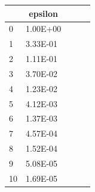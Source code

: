 \begin{table}[H]
\begin{tabular}{lllll}
\rowcolor[HTML]{9AB4FF} 
\multicolumn{1}{c}{\cellcolor[HTML]{9AB4FF} row} & \multicolumn{1}{c}{\cellcolor[HTML]{9AB4FF} epsilon}\\ \hline
0 & 1.00E+00 \\ \hline1 & 3.33E-01 \\ \hline2 & 1.11E-01 \\ \hline3 & 3.70E-02 \\ \hline4 & 1.23E-02 \\ \hline5 & 4.12E-03 \\ \hline6 & 1.37E-03 \\ \hline7 & 4.57E-04 \\ \hline8 & 1.52E-04 \\ \hline9 & 5.08E-05 \\ \hline10 & 1.69E-05 \\ \hline\end{tabular}
\end{table}
\caption{Tabel met epsilons per iteratiestap.}
